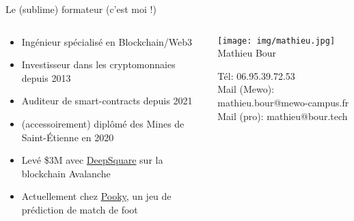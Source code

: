 \begin{frame}{Le (sublime) formateur (c'est moi !)}
  \begin{columns}
    \begin{column}{0.5\textwidth}
      \begin{itemize}
        \item Ingénieur spécialisé en Blockchain/Web3
        \item Investisseur dans les cryptomonnaies depuis 2013
        \item Auditeur de smart-contracts depuis 2021
        \item (accessoirement) diplômé des Mines de Saint-Étienne en 2020
        \item Levé \$3M avec \href{https://deepsquare.io}{DeepSquare} sur la blockchain Avalanche
        \item Actuellement chez \href{https://pooky.gg}{Pooky}, un jeu de prédiction de match de foot
      \end{itemize}
    \end{column}

    \begin{column}{0.5\textwidth}
      \begin{center}
        \texttt{[image: img/mathieu.jpg]} \\
        Mathieu Bour

        Tél: 06.95.39.72.53 \\
        Mail (Mewo): mathieu.bour@mewo-campus.fr \\
        Mail (pro): mathieu@bour.tech
      \end{center}
    \end{column}
  \end{columns}
\end{frame}